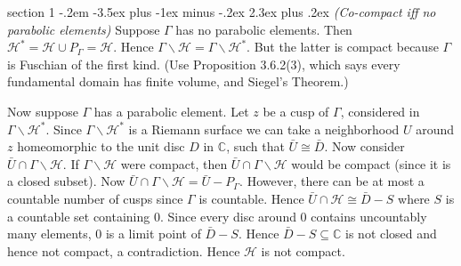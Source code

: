 \documentclass[12pt]{article}
\makeatletter
\theoremstyle{norm}
\newcommand{\C}[0]{\mathbb{C}}
\newcommand{\subeq}[0]{\subseteq}
\newcommand{\Ga}[0]{\Gamma}
\newcommand{\bs}[0]{\backslash}
\newenvironment{problem}{\@startsection
       {section}
       {1}
       {-.2em}
       {-3.5ex plus -1ex minus -.2ex}
       {2.3ex plus .2ex}
       {\pagebreak[3]%
       \large\bf\noindent{Problem }
       }
       }
       {%
       }
\makeatother
\begin{document}
\begin{problem} {\it (Co-compact iff no parabolic elements)}
Suppose $\Ga$ has no parabolic elements. Then $\mathcal{H}^*=\mathcal{H}\cup P_{\Ga}=\mathcal{H}$. Hence $\Ga\bs \mathcal H=\Ga\bs \mathcal H^*$. But the latter is compact because $\Ga$ is Fuschian of the first kind. (Use Proposition 3.6.2(3), which says every fundamental domain has finite volume, and Siegel's Theorem.)

Now suppose $\Ga$ has a parabolic element. Let $z$ be a cusp of $\Ga$, considered in $\Ga\bs\mathcal H^*$. Since $\Ga\bs\mathcal H^*$ is a Riemann surface we can take a neighborhood $U$ around $z$ homeomorphic to the unit disc $D$ in $\C$, such that $\bar{U}\cong \bar{D}$. %
Now consider $\bar{U}\cap\Ga\bs \mathcal{H}$. If $\Ga\bs\mathcal H$ were compact, then $\bar{U}\cap \Ga\bs \mathcal H$ would be compact (since it is a closed subset). Now
$\bar{U}\cap  \Ga\bs \mathcal H=\bar{U}-P_{\Ga}$. However, there can be at most a countable number of cusps since $\Ga$ is countable. Hence $\bar{U}\cap \mathcal H\cong \bar{D}-S$ where $S$ is a countable set containing 0. Since every disc around 0 contains uncountably many elements, 0 is a limit point of $\bar{D}-S$. Hence $\bar{D}-S\subeq \C$ is not closed and hence not compact, a contradiction. 
Hence $\mathcal H$ is not compact.
\end{problem}
\end{document}
